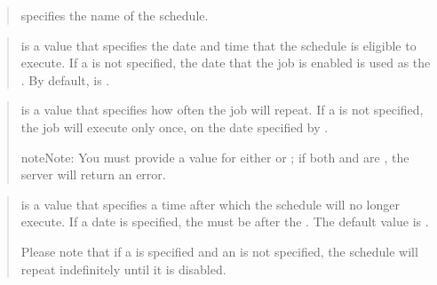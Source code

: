 \documentclass[letterpaper,10pt,english,openany,oneside]{sphinxmanual}
\begin{document}

\begin{quote}

 specifies the name of the schedule.
\end{quote}

\begin{quote}

 is a  value that specifies the
date and time that the schedule is eligible to execute. If a
 is not specified, the date that the job is enabled is
used as the . By default,  is .
\end{quote}

\begin{quote}

 is a  value that specifies how often the
job will repeat. If a  is not specified, the job
will execute only once, on the date specified by .

\begin{sphinxadmonition}{note}{Note:}
You must provide a value for either  or ; if both  and  are , the server will return an error.
\end{sphinxadmonition}
\end{quote}

\begin{quote}

 is a  value that specifies a
time after which the schedule will no longer execute. If a date is
specified, the  must be after the . The
default value is .

Please note that if a  is specified and an
 is not specified, the schedule will repeat indefinitely
until it is disabled.
\end{quote}
\end{document}
